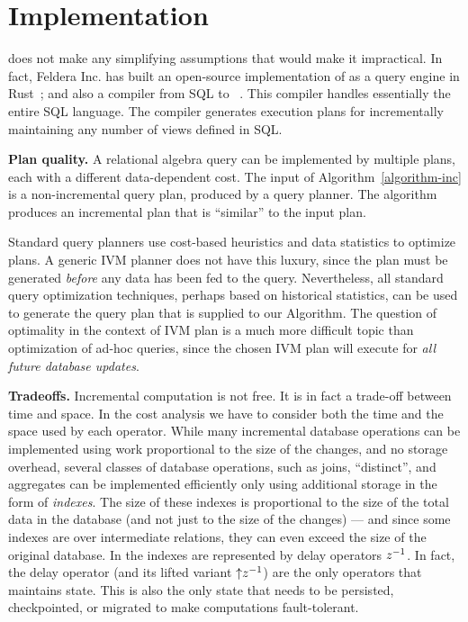 \section{Implementation}\label{sec:implementation}


\dbsp does not make any simplifying assumptions that would make it
impractical.  In fact, Feldera Inc. has built an open-source
implementation of \dbsp as a query engine in Rust~\cite{dbsp-crate};
and also a compiler from SQL to \dbsp~\cite{sql-to-dbsp-compiler}.
This compiler handles essentially the entire SQL language.  The
compiler generates execution plans for incrementally maintaining any
number of views defined in SQL.

\textbf{Plan quality.}  A relational algebra query can be implemented
by multiple plans, each with a different data-dependent cost.  The
input of Algorithm~\ref{algorithm-inc} is a non-incremental query
plan, produced by a query planner.  The algorithm produces an
incremental plan that is ``similar'' to the input plan.

Standard query planners use cost-based heuristics and data statistics
to optimize plans.  A generic IVM planner does not have this luxury,
since the plan must be generated \emph{before} any data has been fed
to the query.  Nevertheless, all standard query optimization
techniques, perhaps based on historical statistics, can be used to
generate the query plan that is supplied to our Algorithm.  The
question of optimality in the context of IVM plan is a much more
difficult topic than optimization of ad-hoc queries, since the chosen
IVM plan will execute for \emph{all future database updates}.

\textbf{Tradeoffs.}  Incremental computation is not free.  It is in
fact a trade-off between time and space.  In the cost analysis we have
to consider both the time and the space used by each operator.  While
many incremental database operations can be implemented using work
proportional to the size of the changes, and no storage overhead,
several classes of database operations, such as joins, ``distinct'',
and aggregates can be implemented efficiently only using additional
storage in the form of \emph{indexes}.  The size of these indexes is
proportional to the size of the total data in the database (and not
just to the size of the changes) --- and since some indexes are over
intermediate relations, they can even exceed the size of the original
database.  In \dbsp the indexes are represented by delay operators
$z^{-1}$.  In fact, the delay operator (and its lifted variant
${\uparrow}z^{-1}$) are the only operators that maintains state.  This is
also the only state that needs to be persisted, checkpointed, or
migrated to make \dbsp computations fault-tolerant.

